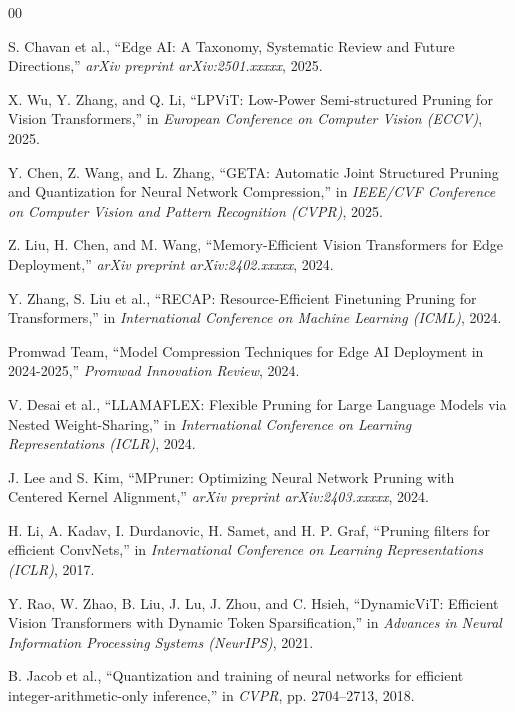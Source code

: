 \documentclass[11pt, conference]{IEEEtran}
\begin{document}
\begin{thebibliography}{00}

S. Chavan et al., ``Edge AI: A Taxonomy, Systematic Review and Future Directions,'' \textit{arXiv preprint arXiv:2501.xxxxx}, 2025.

X. Wu, Y. Zhang, and Q. Li, ``LPViT: Low-Power Semi-structured Pruning for Vision Transformers,'' in \textit{European Conference on Computer Vision (ECCV)}, 2025.

Y. Chen, Z. Wang, and L. Zhang, ``GETA: Automatic Joint Structured Pruning and Quantization for Neural Network Compression,'' in \textit{IEEE/CVF Conference on Computer Vision and Pattern Recognition (CVPR)}, 2025.

Z. Liu, H. Chen, and M. Wang, ``Memory-Efficient Vision Transformers for Edge Deployment,'' \textit{arXiv preprint arXiv:2402.xxxxx}, 2024.

Y. Zhang, S. Liu et al., ``RECAP: Resource-Efficient Finetuning Pruning for Transformers,'' in \textit{International Conference on Machine Learning (ICML)}, 2024.

Promwad Team, ``Model Compression Techniques for Edge AI Deployment in 2024-2025,'' \textit{Promwad Innovation Review}, 2024.

V. Desai et al., ``LLAMAFLEX: Flexible Pruning for Large Language Models via Nested Weight-Sharing,'' in \textit{International Conference on Learning Representations (ICLR)}, 2024.

J. Lee and S. Kim, ``MPruner: Optimizing Neural Network Pruning with Centered Kernel Alignment,'' \textit{arXiv preprint arXiv:2403.xxxxx}, 2024.

H. Li, A. Kadav, I. Durdanovic, H. Samet, and H. P. Graf, ``Pruning filters for efficient ConvNets,'' in \textit{International Conference on Learning Representations (ICLR)}, 2017.

Y. Rao, W. Zhao, B. Liu, J. Lu, J. Zhou, and C. Hsieh, ``DynamicViT: Efficient Vision Transformers with Dynamic Token Sparsification,'' in \textit{Advances in Neural Information Processing Systems (NeurIPS)}, 2021.

B. Jacob et al., ``Quantization and training of neural networks for efficient integer-arithmetic-only inference,'' in \textit{CVPR}, pp. 2704--2713, 2018.


\end{thebibliography}
\end{document}
